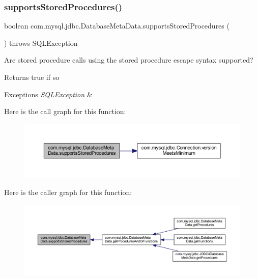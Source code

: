 \subsubsection{\texorpdfstring{supports\+Stored\+Procedures()}{supportsStoredProcedures()}}
{\footnotesize\ttfamily boolean com.\+mysql.\+jdbc.\+Database\+Meta\+Data.\+supports\+Stored\+Procedures (\begin{DoxyParamCaption}{ }\end{DoxyParamCaption}) throws S\+Q\+L\+Exception}

Are stored procedure calls using the stored procedure escape syntax supported?

\begin{DoxyReturn}{Returns}
true if so 
\end{DoxyReturn}

\begin{DoxyExceptions}{Exceptions}
{\em S\+Q\+L\+Exception} & \\
\hline
\end{DoxyExceptions}
Here is the call graph for this function\+:
\nopagebreak
\begin{figure}[H]
\begin{center}
\leavevmode
\includegraphics[width=350pt]{classcom_1_1mysql_1_1jdbc_1_1_database_meta_data_ad177e70c15d38612e5aa008f7078bc33_cgraph}
\end{center}
\end{figure}
Here is the caller graph for this function\+:
\nopagebreak
\begin{figure}[H]
\begin{center}
\leavevmode
\includegraphics[width=350pt]{classcom_1_1mysql_1_1jdbc_1_1_database_meta_data_ad177e70c15d38612e5aa008f7078bc33_icgraph}
\end{center}
\end{figure}
\mbox{\label{classcom_1_1mysql_1_1jdbc_1_1_database_meta_data_abc16823d166bde51aac59efa7ada257e}} 
